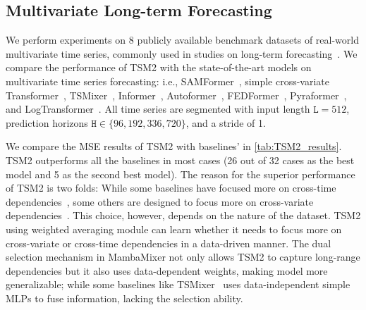 \documentclass{article}
\newcommand{\head}[1]{\vspace{1.7mm}\noindent{{\textcolor{c1}{\bf #1.}}}}
\newcommand*\circled[1]{\tikz[baseline=(char.base)]{
            \node[shape=circle,draw,inner sep=0.3pt, fill=c2] (char) {\textcolor{white}{#1}};}}
\begin{document}
\subsection{Multivariate Long-term Forecasting}
\head{Setup}
We perform experiments on 8 publicly available benchmark datasets of real-world multivariate time series, commonly used in studies on long-term forecasting~\citep{ilbert2024unlocking, chen2023tsmixer, nie2023a}. We compare the performance of TSM2 with the state-of-the-art models on multivariate time series forecasting: i.e., SAMFormer~\citep{ilbert2024unlocking}, simple cross-variate Transformer~\citep{ilbert2024unlocking}, TSMixer~\citep{chen2023tsmixer}, Informer~\citep{zhou2021informer}, Autoformer~\citep{wu2021autoformer}, FEDFormer~\citep{zhou2022fedformer}, Pyraformer~\citep{liu2021pyraformer}, and LogTransformer~\citep{li2019enhancing}. All time series are segmented with input length $\texttt{L} = 512$, prediction horizons $\texttt{H}\in \{96, 192, 336, 720\}$, and a stride of 1.

\head{Results}
We compare the MSE results of TSM2 with baselines' in \autoref{tab:TSM2_results}. TSM2 outperforms all the baselines in most cases (26 out of 32 cases as the best model and 5 as the second best model).  The reason for the superior performance of TSM2 is two folds:\circled{1} While some baselines have focused more on cross-time dependencies~\citep{zhou2021informer, zhou2022fedformer}, some others are designed to focus more on cross-variate dependencies~\citep{ilbert2024unlocking}. This choice, however, depends on the nature of the dataset. TSM2 using weighted averaging module can learn whether it needs to focus more on cross-variate or cross-time dependencies in a data-driven manner. \circled{2} The dual selection mechanism in MambaMixer not only allows TSM2 to capture long-range dependencies but it also uses data-dependent weights, making model more generalizable; while some baselines like TSMixer~\citep{chen2023tsmixer} uses data-independent simple MLPs to fuse information, lacking the selection ability. 
\end{document}
